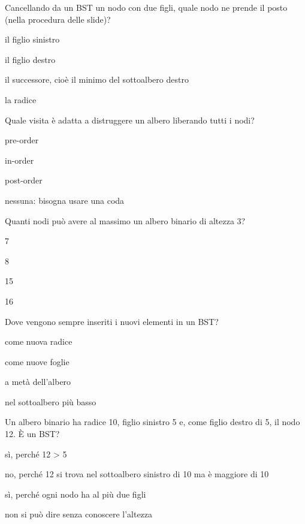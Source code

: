 \begin{quiz}{Cancellando da un BST un nodo con due figli, quale nodo ne prende il posto (nella procedura delle slide)?}
  \item il figlio sinistro
  \item il figlio destro
  \item il successore, cioè il minimo del sottoalbero destro
  \item la radice
\end{quiz}

\begin{quiz}{Quale visita è adatta a distruggere un albero liberando tutti i nodi?}
  \item pre-order
  \item in-order
  \item post-order
  \item nessuna: bisogna usare una coda
\end{quiz}

\begin{quiz}{Quanti nodi può avere al massimo un albero binario di altezza 3?}
  \item 7
  \item 8
  \item 15
  \item 16
\end{quiz}

\begin{quiz}{Dove vengono sempre inseriti i nuovi elementi in un BST?}
  \item come nuova radice
  \item come nuove foglie
  \item a metà dell'albero
  \item nel sottoalbero più basso
\end{quiz}

\begin{quiz}{Un albero binario ha radice 10, figlio sinistro 5 e, come figlio destro di 5, il nodo 12. È un BST?}
  \item sì, perché 12 > 5
  \item no, perché 12 si trova nel sottoalbero sinistro di 10 ma è maggiore di 10
  \item sì, perché ogni nodo ha al più due figli
  \item non si può dire senza conoscere l'altezza
\end{quiz}


